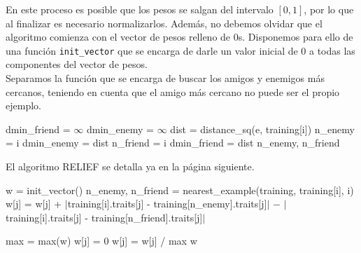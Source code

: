 \documentclass[12pt]{article}
\begin{document}
En este proceso es posible que los pesos se salgan del intervalo $[0,1]$, por lo que al finalizar es necesario normalizarlos. Además, no debemos olvidar que el algoritmo comienza con el vector de pesos relleno de $0$s. Disponemos para ello de una función \verb|init_vector| que se encarga de darle un valor inicial de $0$ a todas las componentes del vector de pesos.\\

Separamos la función que se encarga de buscar los amigos y enemigos más cercanos, teniendo en cuenta que el amigo más cercano no puede ser el propio ejemplo.

\begin{algorithm}[h]
\begin{algorithmic}

     \State dmin\_friend = $\infty$
     \State dmin\_enemy = $\infty$
       
            \State dist = distance\_sq(e, training[i])
                  \State n\_enemy = i
                  \State dmin\_enemy = dist
                  \State n\_friend = i
                  \State dmin\_friend = dist
            \EndIf
          \EndIf
       \EndFor
   \State \Return n\_enemy, n\_friend
\EndFunction

\end{algorithmic}
\end{algorithm}

El algoritmo RELIEF se detalla ya en la página siguiente.
\newpage

\begin{algorithm}[h!]
\begin{algorithmic}

     \State w = init\_vector()
       
         \State n\_enemy, n\_friend = nearest\_example(training, training[i], i)
           
            \State w[j] = w[j] + $|$training[i].traits[j] - training[n\_enemy].traits[j]$|$
            \State \hspace{2.5em} $-$ $|$training[i].traits[j] - training[n\_friend].traits[j]$|$

         \EndFor
      \EndFor
      \State max = max(w)
        
            \State w[j] = 0
        \Else
            \State w[j] = w[j] / max
        \EndIf
      \EndFor
\State \Return w
\EndFunction

\end{algorithmic}
\end{algorithm}
\end{document}

